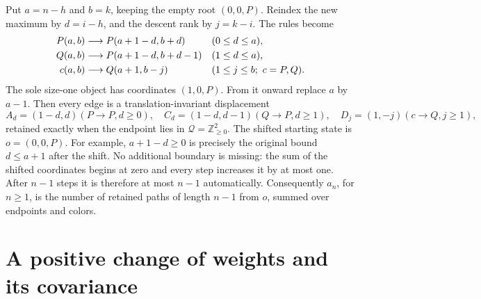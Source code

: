 \documentclass[11pt,letterpaper]{article}
\theoremstyle{remark}\newtheorem{remark}[theorem]{Remark}
\newcommand{\ZZ}{\mathbb Z}
\newcommand{\Qd}{\mathcal Q}
\newcommand{\1}{\mathbf1}
\begin{document}
Put $a=n-h$ and $b=k$, keeping the empty root $(0,0,P)$. Reindex the
new maximum by $d=i-h$, and the descent rank by $j=k-i$. The rules become
\begin{align}
 P(a,b)&\longrightarrow P(a+1-d,b+d) &&(0\le d\le a),\label{icw:eq:tree}\\
 Q(a,b)&\longrightarrow P(a+1-d,b+d-1)&&(1\le d\le a),\notag\\
 c(a,b)&\longrightarrow Q(a+1,b-j)&&(1\le j\le b;\ c=P,Q).\notag
\end{align}
The sole size-one object has coordinates $(1,0,P)$. From it onward replace
$a$ by $a-1$. Then every edge is a translation-invariant displacement
\begin{equation}\label{icw:eq:increments}
 A_d=(1-d,d) (P\to P,d\ge0),\quad
 C_d=(1-d,d-1) (Q\to P,d\ge1),\quad
 D_j=(1,-j) (c\to Q,j\ge1),
\end{equation}
retained exactly when the endpoint lies in
$\Qd=\ZZ_{\ge0}^2$. The shifted starting state is $o=(0,0,P)$.
For example, $a+1-d\ge0$ is precisely the original bound $d\le a+1$
after the shift. No additional boundary is missing: the sum of the
shifted coordinates begins at zero and every step increases it by at
most one. After $n-1$ steps it is therefore at most $n-1$ automatically.
Consequently $a_n$, for $n\ge1$, is the number of retained paths of
length $n-1$ from $o$, summed over endpoints and colors.

\section{A positive change of weights and its covariance}\label{icw:sec:tilt}
\end{document}
